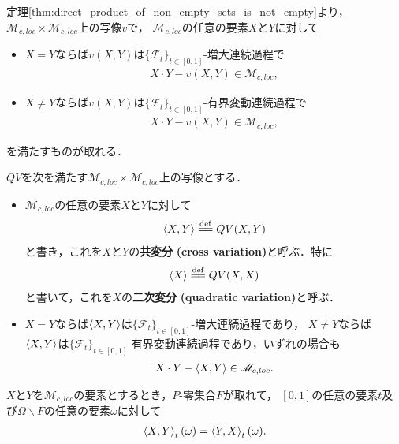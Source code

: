 	定理\ref{thm:direct_product_of_non_empty_sets_is_not_empty}より，
	$\mathscr{M}_{c,loc} \times \mathscr{M}_{c,loc}$上の写像$v$で，
	$\mathscr{M}_{c,loc}$の任意の要素$X$と$Y$に対して
	\begin{itemize}
		\item $X = Y$ならば$v(X,Y)$は$\{\mathscr{F}_{t}\}_{t \in [0,1]}$-増大連続過程で
			\begin{align}
				X \cdot Y - v(X,Y) \in \mathscr{M}_{c,loc},
			\end{align}
			
		\item $X \neq Y$ならば$v(X,Y)$は$\{\mathscr{F}_{t}\}_{t \in [0,1]}$-有界変動連続過程で
			\begin{align}
				X \cdot Y - v(X,Y) \in \mathscr{M}_{c,loc},
			\end{align}
	\end{itemize}
	を満たすものが取れる．
	
	\begin{screen}
		\begin{dfn}[二次変分]
			$QV$を次を満たす$\mathscr{M}_{c,loc} \times \mathscr{M}_{c,loc}$上の写像とする．
			\begin{itemize}
				\item $\mathscr{M}_{c,loc}$の任意の要素$X$と$Y$に対して
					\begin{align}
						\inprod<X,Y> \defeq QV(X,Y)
					\end{align}
					と書き，これを$X$と$Y$の{\bf 共変分}
					{\bf (cross variation)}と呼ぶ．特に
					\begin{align}
						\inprod<X> \defeq QV(X,X)
					\end{align}
					と書いて，これを$X$の{\bf 二次変分}
					{\bf (quadratic variation)}と呼ぶ．
					
				\item $X = Y$ならば$\inprod<X,Y>$は$\{\mathscr{F}_{t}\}_{t \in [0,1]}$-増大連続過程であり，
				$X \neq Y$ならば$\inprod<X,Y>$は$\{\mathscr{F}_{t}\}_{t \in [0,1]}$-有界変動連続過程であり，いずれの場合も
					\begin{align}
						X \cdot Y - \inprod<X,Y> \in \mathscr{M}_{c,loc}.
					\end{align}
			\end{itemize}
		\end{dfn}
	\end{screen}
	
	\begin{screen}
		\begin{thm}[共変分の対称性]
			$X$と$Y$を$\mathscr{M}_{c,loc}$の要素とするとき，$P$-零集合$F$が取れて，
			$[0,1]$の任意の要素$t$及び$\Omega \backslash F$の任意の要素$\omega$に対して
			\begin{align}
				\inprod<X,Y>_{t}(\omega) = \inprod<Y,X>_{t}(\omega).
			\end{align}
		\end{thm}
	\end{screen}
	
